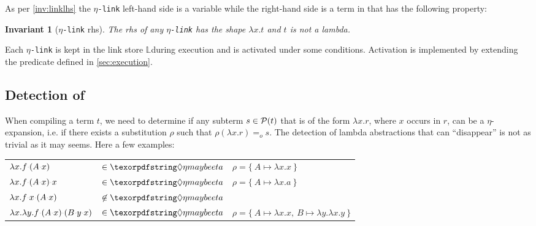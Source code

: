 \documentclass[sigconf,natbib=false,review]{acmart}
\newtheorem{invariant}{Invariant}
\newcommand{\appsep}{\ensuremath{\textcolor{lightgray}{\cdot}}}
\newcommand{\EqualRel}{\ensuremath{=}}
\newcommand{\Eo}{\ensuremath{\EqualRel_o}\xspace}
\newcommand{\linkMacro}[1]{\ensuremath{#1}\texttt{-link}\xspace}
\newcommand{\linketa} {\linkMacro{\eta}}
\newcommand{\rhs}{rhs\xspace}
\newcommand{\linkStore}{\texorpdfstring{\ensuremath{\mathbb{L}}\xspace}{L}}
\begin{document}
\noindent
As per \cref{inv:linklhs} the \linketa left-hand side is a variable
while the right-hand side is a term in \maybeeta that has the following property:

\begin{invariant}[\linketa \rhs]
  The \rhs of any \linketa %
  has the shape $\lambda x.t$
  and $t$ is not a lambda. 
  \label{inv:link-eta-right}
\end{invariant}

Each \linketa is kept in the link store \linkStore during execution
and is activated under some conditions.
Activation is implemented by extending the 
predicate defined in \cref{sec:execution}.

\subsection{Detection of \maybeeta}\label{sec:etadetection}

When compiling a term $t$, we need to determine if any
subterm $s \in \mathcal{P}(t)$ that is of the form $\lambda x. r$,
where $x$ occurs in $r$, can be a $\eta$-expansion, i.e. if
there exists a substitution $\rho$ such that $\rho (\lambda x.r) \Eo s$.
The detection of lambda abstractions that can ``disappear''
is not as trivial as it may seems. Here a few examples:
%
\begin{center}
  \begin{tabular}{lll}
    $\lambda x. f \appsep (A \appsep x)$ & $\in\maybeeta$ & $\rho = \{~ A \mapsto \lambda x.x ~\}$ \\
    $\lambda x. f \appsep (A \appsep x) \appsep x$ & $\in\maybeeta$ & $\rho = \{~ A \mapsto \lambda x.a ~\}$\\
    $\lambda x. f \appsep x \appsep (A \appsep x)$ & $\not\in\maybeeta$ &\\
    $\lambda x. \lambda y. f \appsep (A \appsep x) \appsep (B \appsep y \appsep x)$ & $\in\maybeeta$ & $\rho = \{~ A \mapsto \lambda x.x,~ B \mapsto \lambda y.\lambda x.y ~\}$
  \end{tabular}
\end{center}
\vspace{4pt}
\end{document}
